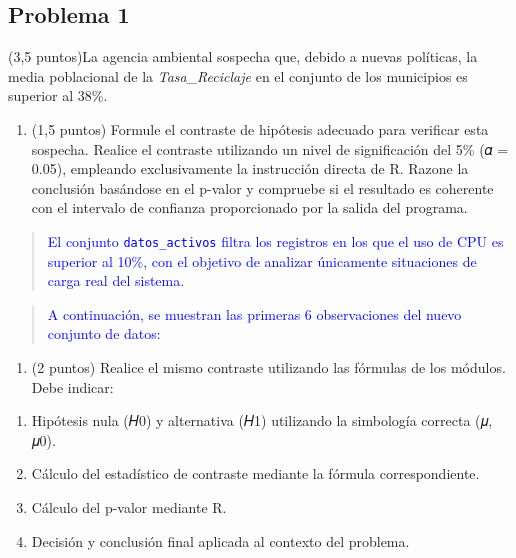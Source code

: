\documentclass[
]{article}
\providecommand{\tightlist}{%
  \setlength{\itemsep}{0pt}\setlength{\parskip}{0pt}}
\begin{document}
\subsection{Problema 1}\label{problema-1}

(3,5 puntos)La agencia ambiental sospecha que, debido a nuevas
políticas, la media poblacional de la \emph{Tasa\_Reciclaje} en el
conjunto de los municipios es superior al 38\%.

\begin{enumerate}
\def\labelenumi{\alph{enumi})}
\tightlist
\item
  (1,5 puntos) Formule el contraste de hipótesis adecuado para verificar
  esta sospecha. Realice el contraste utilizando un nivel de
  significación del 5\% (𝛼 = 0.05), empleando exclusivamente la
  instrucción directa de R. Razone la conclusión basándose en el p-valor
  y compruebe si el resultado es coherente con el intervalo de confianza
  proporcionado por la salida del programa.
\end{enumerate}

\begin{quote}
\textcolor{blue}{El conjunto \texttt{datos\_activos}
filtra los registros en los que el uso de CPU es superior al 10\%, con el objetivo de analizar únicamente situaciones de carga real del sistema.}
\end{quote}

\begin{quote}
\textcolor{blue}{ 
A continuación, se muestran las primeras 6 observaciones del nuevo conjunto de datos:
}
\end{quote}

\begin{enumerate}
\def\labelenumi{\alph{enumi})}
\setcounter{enumi}{1}
\tightlist
\item
  (2 puntos) Realice el mismo contraste utilizando las fórmulas de los
  módulos. Debe indicar:
\end{enumerate}

\begin{enumerate}
\def\labelenumi{\arabic{enumi}.}
\tightlist
\item
  Hipótesis nula (𝐻0) y alternativa (𝐻1) utilizando la simbología
  correcta (𝜇, 𝜇0).
\item
  Cálculo del estadístico de contraste mediante la fórmula
  correspondiente.
\item
  Cálculo del p-valor mediante R.
\item
  Decisión y conclusión final aplicada al contexto del problema.
\end{enumerate}
\end{document}
